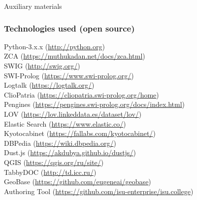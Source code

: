 \documentclass[10pt]{beamer}
\begin{document}
\begin{frame}
  \begin{center}
  \Large Auxiliary materials
\end{center}
\end{frame}

\begin{frame}
  \frametitle{Technologies used (open source)}
  Python-3.x.x (\url{http://python.org})\\
  ZCA (\url{https://muthukadan.net/docs/zca.html})\\
  SWIG (\url{http://swig.org/})\\
  SWI-Prolog (\url{https://www.swi-prolog.org/})\\
  Logtalk (\url{https://logtalk.org/})\\
  ClioPatria (\url{https://cliopatria.swi-prolog.org/home})\\
  Pengines (\url{https://pengines.swi-prolog.org/docs/index.html})\\
  LOV (\url{https://lov.linkeddata.es/dataset/lov/})\\
  Elastic Search (\url{https://www.elastic.co/})\\
  Kyotocabinet (\url{https://fallabs.com/kyotocabinet/})\\
  DBPedia (\url{https://wiki.dbpedia.org/})\\
  Dust.js (\url{https://akdubya.github.io/dustjs/})\\
  QGIS (\url{https://qgis.org/ru/site/})\\
  TabbyDOC (\url{http://td.icc.ru/})\\
  GeoBase (\url{https://github.com/eugeneai/geobase})\\
  Authoring Tool (\url{https://github.com/isu-enterprise/isu.college})
\end{frame}
\end{document}
